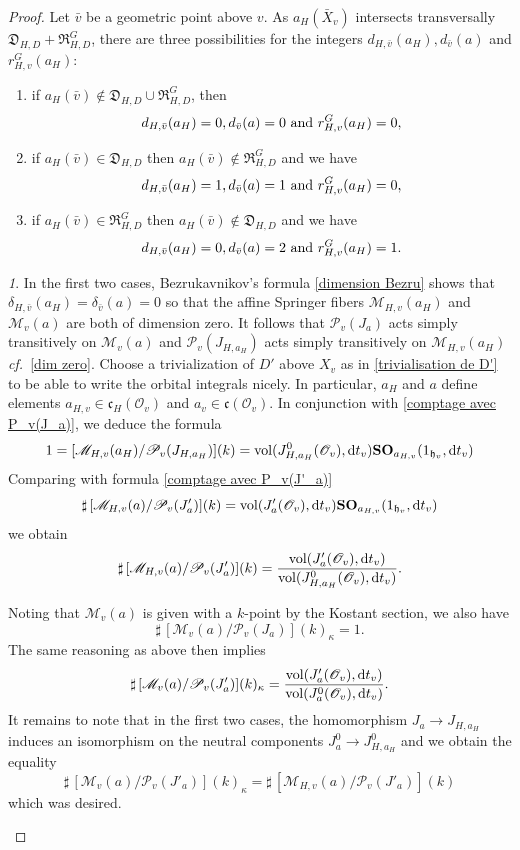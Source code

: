 \documentclass[12pt,english]{smfart}
\numberwithin{equation}{subsection}
\theoremstyle{remark}
\newtheorem{numero}[equation]{}
\newcommand\calP{{\mathscr P}}
\newcommand\calM{{\mathscr M}}
\newcommand\calO{{\mathscr O}}
\newcommand\frakc{{\mathfrak c}}
\newcommand\frakh{\mathfrak h}
\newcommand\cf{{\it cf.\ }}
\newcommand\resultant{\mathfrak R}
\newcommand\discrim{\mathfrak D}
\begin{document}
\begin{proof}
Let ${\bar v}$ be a geometric point above $v$. As $a_H(\bar
X_v)$ intersects transversally $\discrim_{H,D}+\resultant_{H,D}^G$, there are
three possibilities for the integers $d_{H,\bar v}(a_H), d_{\bar v}(a)$ and
$r_{H,v}^G(a_H)$:
\begin{enumerate}
 \item if $a_H(\bar v)\notin \discrim_{H,D}\cup \resultant_{H,D}^G$,
   then
$$d_{H,\bar v}(a_H)=0, d_{\bar v}(a)=0\ {\rm and}\ r_{H,v}^G(a_H)=0,$$
 \item if $a_H(\bar v)\in \discrim_{H,D}$ then $a_H(\bar v)\notin
   \resultant_{H,D}^G$ and we have
$$d_{H,\bar v}(a_H)=1, d_{\bar v}(a)=1 \ {\rm and}\ r_{H,v}^G(a_H)=0,$$
 \item if $a_H(\bar v)\in \resultant_{H,D}^G$ then $a_H(\bar v)\notin
   \discrim_{H,D}$ and we have
$$d_{H,\bar v}(a_H)=0, d_{\bar v}(a)=2\ {\rm and}\ r_{H,v}^G(a_H)=1.$$
\end{enumerate}

\begin{numero}
In the first two cases, Bezrukavnikov's formula \ref{dimension
Bezru} shows that $\delta_{H,\bar v}(a_H)=\delta_{\bar v}(a)=0$ so that
the affine Springer fibers $\calM_{H,v}(a_H)$ and $\calM_v(a)$ are
both of dimension zero. It follows that $\calP_v(J_a)$ acts
simply transitively on $\calM_v(a)$ and $\calP_v(J_{H,a_H})$ acts
simply transitively on $\calM_{H,v}(a_H)$ \cf \ref{dim zero}.
Choose a trivialization of $D'$ above $X_v$ as in
\ref{trivialisation de D'} to be able to write the orbital
integrals nicely. In particular, $a_H$ and $a$ define elements
$a_{H,v}\in \frakc_H(\calO_v)$ and $a_v\in\frakc(\calO_v)$. In conjunction
with \ref{comptage avec P_v(J_a)}, we deduce the formula
$$1=[\calM_{H,v}(a_H)/\calP_v(J_{H,a_H})](k)
={\rm vol}(J^0_{H,a_H}(\calO_v),{\rm d}t_v){\bf
SO}_{a_{H,v}}(1_{\frakh_v},{\rm d}t_v)
$$
Comparing with formula \ref{comptage avec P_v(J'_a)}
$$\sharp\,[\calM_{H,v}(a)/\calP_v(J'_a)](k)=
{\rm vol}(J'_a(\calO_v),{\rm d}t_v){\bf SO}_{a_{H,v}}(1_{\frakh_v},{\rm
d}t_v)
$$
we obtain
$$\sharp\,[\calM_{H,v}(a)/\calP_v(J'_a)](k)=\frac{{\rm vol} (J'_a(\calO_v),{\rm
d}t_v)}{{\rm vol}(J^0_{H,a_H}(\calO_v),{\rm d}t_v)}.$$

Noting that $\calM_v(a)$ is given with a $k$-point by the
Kostant section, we also have
$$\sharp\, [\calM_v(a)/\calP_v(J_a)](k)_\kappa=1.$$
The same reasoning as above then implies
$$\sharp\,[\calM_{v}(a)/\calP_v(J'_a)](k)_\kappa=\frac{{\rm vol} (J'_a(\calO_v),{\rm
d}t_v)}{{\rm vol}(J^0_{a}(\calO_v),{\rm d}t_v)}.
$$
It remains to note that in the first two cases, the homomorphism
$J_a\rightarrow J_{H,a_H}$ induces an isomorphism on the neutral components
$J_a^0\rightarrow J_{H,a_H}^0$ and we obtain the equality
$$\sharp\,[\calM_v(a)/\calP_v(J'_a)](k)_\kappa=
\sharp\,[\calM_{H,v}(a)/\calP_v(J'_a)](k)
$$
which was desired.
\end{numero}


\end{proof}
\end{document}
